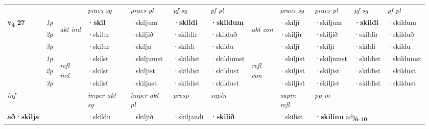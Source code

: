\begin{longtable}[l]{X>{\footnotesize\itshape}llXXXXlXXXX}
 & &   & \textit{praes sg}  & \textit{praes pl}    & \textit{ pf sg} & \textit{pf pl} & & \textit{praes sg}  & \textit{praes pl}    & \textit{pf sg} & \textit{pf pl }  \\ \cmidrule{4-7} \cmidrule{9-12}
 \multirow{2}{*}{{{\textbf{v{\textsubscript{4}}} \Large{\textbf{27}}}}}  & 1p & \multirow{3}{*}{\begin{turn}{90}\textit{akt ind}\end{turn}} & \textbf{·skil} & ·skiljum & \textbf{·skildi} & \textbf{·skildum} & \multirow{3}{*}{\begin{turn}{90}\textit{akt con}\end{turn}} &·skilji & ·skiljum & \textbf{·skildi} & ·skildum\\*
 & 2p &  &  ·skilur  & ·skiljið & ·skildir & ·skilduð & & ·skiljir & ·skiljið & ·skildir & ·skilduð \\*
 & 3p &  & ·skilur & ·skilja & ·skildi & ·skildu & & ·skilji & ·skilji& ·skildi & ·skildu \\*
\cmidrule{4-7} \cmidrule{9-12}
 & 1p & \multirow{3}{*}{\begin{turn}{90}\textit{refl ind}\end{turn}}  & ·skilst & ·skiljumst & ·skildist & ·skildumst & \multirow{3}{*}{\begin{turn}{90}\textit{refl con}\end{turn}}  &·skiljist & ·skiljumst & ·skildist & ·skildumst \\*
 & 2p &  & ·skilst & ·skiljist & ·skildist & ·skildust & &·skiljist & ·skiljist & ·skildist & ·skildust \\*
 & 3p  & & ·skilst & ·skiljast & ·skildist & ·skildust & & ·skiljist & ·skiljist& ·skildist & ·skildust \\*
\cmidrule{4-7} \cmidrule{9-12}

   {\textit{inf}} & &  & \textit{imper akt sg} & \textit{imper akt pl}   & \textit{presp} & \textit{supin} && \textit{supin refl} & \textit{pp m} \\*
  {\textbf{að\allowbreak ·skilja}} & && ·skildu  & ·skiljið   & ·skiljandi &  \textbf{·skilið} && ·skilist & \multicolumn{2}{l}{\textbf{·skilinn} adj\textbf{\textsubscript{6-10}}} \\*

\midrule


\end{longtable}
